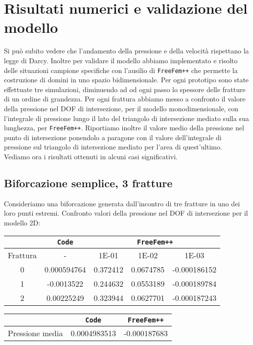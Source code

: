\chapter{Risultati numerici e validazione del modello} 
Si pu\`{o} subito vedere che l'andamento della pressione e della velocit\`{a} rispettano la legge di Darcy.
Inoltre per validare il modello abbiamo implementato e risolto delle situazioni campione specifiche con l'ausilio di \texttt{FreeFem++} che permette la costruzione di domini in uno spazio bidimensionale. Per ogni prototipo sono state effettuate tre simulazioni, diminuendo ad od ogni passo lo spessore delle fratture di un ordine di grandezza. 
Per ogni frattura abbiamo messo a confronto il valore della pressione nel DOF di intersezione, per il modello monodimensionale, con l'integrale di pressione lungo il lato del triangolo di intersezione mediato sulla sua lunghezza, per \texttt{FreeFem++}.
Riportiamo inoltre il valore medio della pressione nel punto di intersezione ponendolo a paragone con il valore dell'integrale di pressione sul triangolo di intersezione mediato per l'area di quest'ultimo.\\
Vediamo ora i risultati ottenuti in alcuni casi significativi.
\section{Biforcazione semplice, 3 fratture}
Consideriamo una biforcazione generata dall'incontro di tre fratture in uno dei loro punti estremi.
Confronto valori della pressione nel DOF di intersezione per il modello 2D:\\
\begin{center}
\begin{tabular}{|c|c|c|c|c|}
\hline
 & \textbf{\texttt{Code}} & \multicolumn{3}{|c|}{\textbf{\texttt{FreeFem++}}} \\
\hline
\multicolumn{1}{|c|}{Frattura} & - &
\multicolumn{1}{|c|}{1E-01} & 1E-02 & 1E-03 \\
\hline
 0 & 0.000594764 & 0.372412 & 0.0674785 & -0.000186152\\
 1 & -0.0013522 & 0.244632 & 0.0553189 & -0.000189784\\
 2 & 0.00225249 & 0.323944 & 0.0627701 & -0.000187243\\
\hline
\end{tabular}
\end{center}

\begin{center}
\begin{tabular}{|c|c|c|}
\hline
 & \textbf{\texttt{Code}} & \multicolumn{1}{|c|}{\textbf{\texttt{FreeFem++}}} \\
\hline
 Pressione media & 0.0004983513 & -0.000187683\\
\hline
\end{tabular}
\end{center}


